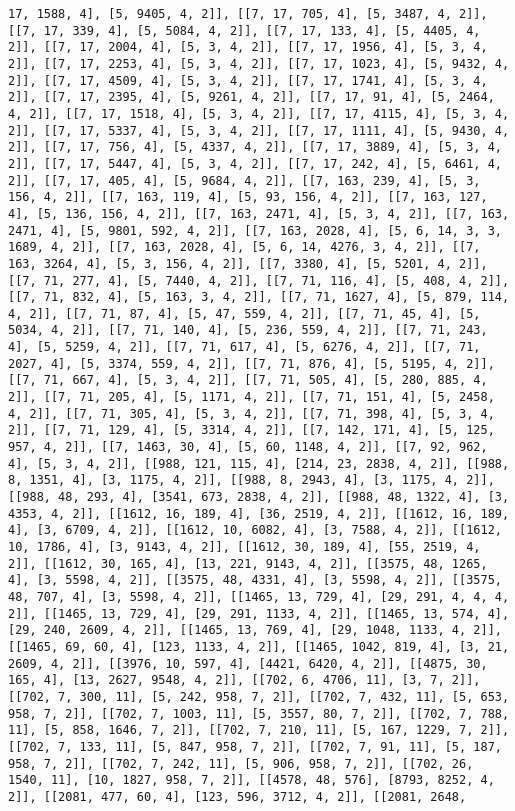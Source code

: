 \documentclass[12pt,fleqn]{article}\usepackage{../../common}
\begin{document}
\begin{verbatim}
17, 1588, 4], [5, 9405, 4, 2]], [[7, 17, 705, 4], [5, 3487, 4, 2]], [[7, 17, 339, 4], [5, 5084, 4, 2]], [[7, 17, 133, 4], [5, 4405, 4, 2]], [[7, 17, 2004, 4], [5, 3, 4, 2]], [[7, 17, 1956, 4], [5, 3, 4, 2]], [[7, 17, 2253, 4], [5, 3, 4, 2]], [[7, 17, 1023, 4], [5, 9432, 4, 2]], [[7, 17, 4509, 4], [5, 3, 4, 2]], [[7, 17, 1741, 4], [5, 3, 4, 2]], [[7, 17, 2395, 4], [5, 9261, 4, 2]], [[7, 17, 91, 4], [5, 2464, 4, 2]], [[7, 17, 1518, 4], [5, 3, 4, 2]], [[7, 17, 4115, 4], [5, 3, 4, 2]], [[7, 17, 5337, 4], [5, 3, 4, 2]], [[7, 17, 1111, 4], [5, 9430, 4, 2]], [[7, 17, 756, 4], [5, 4337, 4, 2]], [[7, 17, 3889, 4], [5, 3, 4, 2]], [[7, 17, 5447, 4], [5, 3, 4, 2]], [[7, 17, 242, 4], [5, 6461, 4, 2]], [[7, 17, 405, 4], [5, 9684, 4, 2]], [[7, 163, 239, 4], [5, 3, 156, 4, 2]], [[7, 163, 119, 4], [5, 93, 156, 4, 2]], [[7, 163, 127, 4], [5, 136, 156, 4, 2]], [[7, 163, 2471, 4], [5, 3, 4, 2]], [[7, 163, 2471, 4], [5, 9801, 592, 4, 2]], [[7, 163, 2028, 4], [5, 6, 14, 3, 3, 1689, 4, 2]], [[7, 163, 2028, 4], [5, 6, 14, 4276, 3, 4, 2]], [[7, 163, 3264, 4], [5, 3, 156, 4, 2]], [[7, 3380, 4], [5, 5201, 4, 2]], [[7, 71, 277, 4], [5, 7440, 4, 2]], [[7, 71, 116, 4], [5, 408, 4, 2]], [[7, 71, 832, 4], [5, 163, 3, 4, 2]], [[7, 71, 1627, 4], [5, 879, 114, 4, 2]], [[7, 71, 87, 4], [5, 47, 559, 4, 2]], [[7, 71, 45, 4], [5, 5034, 4, 2]], [[7, 71, 140, 4], [5, 236, 559, 4, 2]], [[7, 71, 243, 4], [5, 5259, 4, 2]], [[7, 71, 617, 4], [5, 6276, 4, 2]], [[7, 71, 2027, 4], [5, 3374, 559, 4, 2]], [[7, 71, 876, 4], [5, 5195, 4, 2]], [[7, 71, 667, 4], [5, 3, 4, 2]], [[7, 71, 505, 4], [5, 280, 885, 4, 2]], [[7, 71, 205, 4], [5, 1171, 4, 2]], [[7, 71, 151, 4], [5, 2458, 4, 2]], [[7, 71, 305, 4], [5, 3, 4, 2]], [[7, 71, 398, 4], [5, 3, 4, 2]], [[7, 71, 129, 4], [5, 3314, 4, 2]], [[7, 142, 171, 4], [5, 125, 957, 4, 2]], [[7, 1463, 30, 4], [5, 60, 1148, 4, 2]], [[7, 92, 962, 4], [5, 3, 4, 2]], [[988, 121, 115, 4], [214, 23, 2838, 4, 2]], [[988, 8, 1351, 4], [3, 1175, 4, 2]], [[988, 8, 2943, 4], [3, 1175, 4, 2]], [[988, 48, 293, 4], [3541, 673, 2838, 4, 2]], [[988, 48, 1322, 4], [3, 4353, 4, 2]], [[1612, 16, 189, 4], [36, 2519, 4, 2]], [[1612, 16, 189, 4], [3, 6709, 4, 2]], [[1612, 10, 6082, 4], [3, 7588, 4, 2]], [[1612, 10, 1786, 4], [3, 9143, 4, 2]], [[1612, 30, 189, 4], [55, 2519, 4, 2]], [[1612, 30, 165, 4], [13, 221, 9143, 4, 2]], [[3575, 48, 1265, 4], [3, 5598, 4, 2]], [[3575, 48, 4331, 4], [3, 5598, 4, 2]], [[3575, 48, 707, 4], [3, 5598, 4, 2]], [[1465, 13, 729, 4], [29, 291, 4, 4, 4, 2]], [[1465, 13, 729, 4], [29, 291, 1133, 4, 2]], [[1465, 13, 574, 4], [29, 240, 2609, 4, 2]], [[1465, 13, 769, 4], [29, 1048, 1133, 4, 2]], [[1465, 69, 60, 4], [123, 1133, 4, 2]], [[1465, 1042, 819, 4], [3, 21, 2609, 4, 2]], [[3976, 10, 597, 4], [4421, 6420, 4, 2]], [[4875, 30, 165, 4], [13, 2627, 9548, 4, 2]], [[702, 6, 4706, 11], [3, 7, 2]], [[702, 7, 300, 11], [5, 242, 958, 7, 2]], [[702, 7, 432, 11], [5, 653, 958, 7, 2]], [[702, 7, 1003, 11], [5, 3557, 80, 7, 2]], [[702, 7, 788, 11], [5, 858, 1646, 7, 2]], [[702, 7, 210, 11], [5, 167, 1229, 7, 2]], [[702, 7, 133, 11], [5, 847, 958, 7, 2]], [[702, 7, 91, 11], [5, 187, 958, 7, 2]], [[702, 7, 242, 11], [5, 906, 958, 7, 2]], [[702, 26, 1540, 11], [10, 1827, 958, 7, 2]], [[4578, 48, 576], [8793, 8252, 4, 2]], [[2081, 477, 60, 4], [123, 596, 3712, 4, 2]], [[2081, 2648, 
\end{verbatim}
\end{document}
